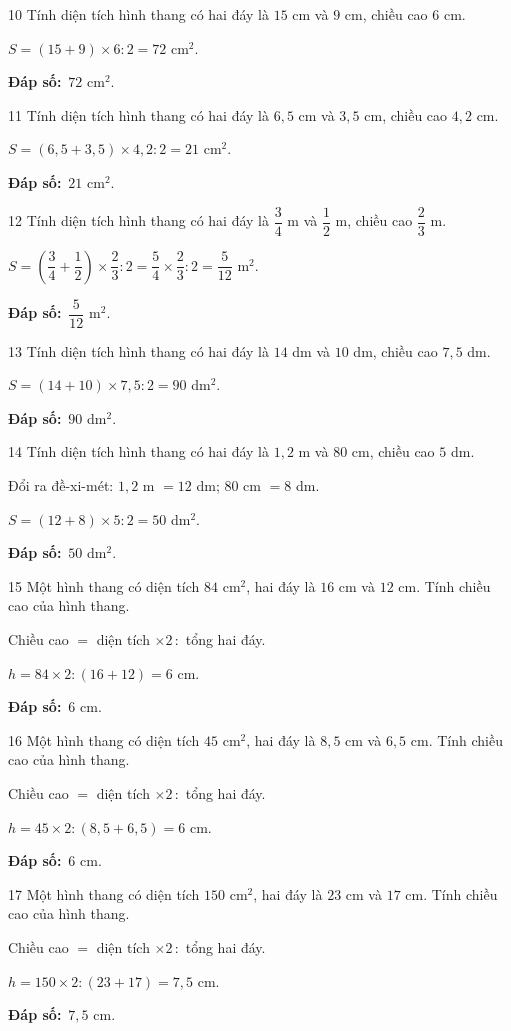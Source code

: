 \documentclass[11pt]{article}
\newif\ifsol \solfalse
\providecommand{\AnsWord}{Đáp số}
\newcommand{\dapso}[1]{\par\textbf{\AnsWord:}\ #1}
\newcommand{\probsol}[1]{%
  \begin{lrbox}{\solmeasure}\begin{minipage}{\dimexpr\linewidth-24pt\relax}#1\end{minipage}\end{lrbox}%
  \ifsol
    \begin{solbox}#1\end{solbox}%
  \else
    \setlength{\solht}{\dimexpr\ht\solmeasure+\dp\solmeasure+0.85cm\relax}%
    \ifdim\solht<1.35cm\setlength{\solht}{1.35cm}\fi
    \begin{tcolorbox}[colback=white,colframe=Line,boxrule=0.8pt,arc=5pt,
      left=8pt,right=8pt,top=4pt,bottom=4pt,height=\solht]{\footnotesize\color{Slate}\itshape\WorkWord}\end{tcolorbox}%
  \fi}
\newcommand{\gap}{\vspace{0.3cm}}
\def\WorkWord{Bài làm:}
\def\AnsWord{Đáp số}
\begin{document}
\gap
\begin{probbox}{10}{\relax}
Tính diện tích hình thang có hai đáy là $15$ cm và $9$ cm, chiều cao $6$ cm.
\end{probbox}
\probsol{
$S=(15+9)\times6:2=72$ cm$^2$.
\dapso{$72$ cm$^2$.}}
\gap
\begin{probbox}{11}{\relax}
Tính diện tích hình thang có hai đáy là $6{,}5$ cm và $3{,}5$ cm, chiều cao $4{,}2$ cm.
\end{probbox}
\probsol{
$S=(6{,}5+3{,}5)\times4{,}2:2=21$ cm$^2$.
\dapso{$21$ cm$^2$.}}
\gap
\begin{probbox}{12}{\relax}
Tính diện tích hình thang có hai đáy là $\dfrac34$ m và $\dfrac12$ m, chiều cao $\dfrac23$ m.
\end{probbox}
\probsol{
$S=\left(\dfrac34+\dfrac12\right)\times\dfrac23:2=\dfrac54\times\dfrac23:2=\dfrac5{12}$ m$^2$.
\dapso{$\dfrac5{12}$ m$^2$.}}
\gap
\begin{probbox}{13}{\relax}
Tính diện tích hình thang có hai đáy là $14$ dm và $10$ dm, chiều cao $7{,}5$ dm.
\end{probbox}
\probsol{
$S=(14+10)\times7{,}5:2=90$ dm$^2$.
\dapso{$90$ dm$^2$.}}
\gap
\begin{probbox}{14}{\relax}
Tính diện tích hình thang có hai đáy là $1{,}2$ m và $80$ cm, chiều cao $5$ dm.
\end{probbox}
\probsol{
Đổi ra đề-xi-mét: $1{,}2$ m $=12$ dm; $80$ cm $=8$ dm.\par $S=(12+8)\times5:2=50$ dm$^2$.
\dapso{$50$ dm$^2$.}}
\gap
\begin{probbox}{15}{\relax}
Một hình thang có diện tích $84$ cm$^2$, hai đáy là $16$ cm và $12$ cm. Tính chiều cao của hình thang.
\end{probbox}
\probsol{
Chiều cao $=$ diện tích $\times2\,:$ tổng hai đáy.\par $h=84\times2:(16+12)=6$ cm.
\dapso{$6$ cm.}}
\gap
\begin{probbox}{16}{\relax}
Một hình thang có diện tích $45$ cm$^2$, hai đáy là $8{,}5$ cm và $6{,}5$ cm. Tính chiều cao của hình thang.
\end{probbox}
\probsol{
Chiều cao $=$ diện tích $\times2\,:$ tổng hai đáy.\par $h=45\times2:(8{,}5+6{,}5)=6$ cm.
\dapso{$6$ cm.}}
\gap
\begin{probbox}{17}{\relax}
Một hình thang có diện tích $150$ cm$^2$, hai đáy là $23$ cm và $17$ cm. Tính chiều cao của hình thang.
\end{probbox}
\probsol{
Chiều cao $=$ diện tích $\times2\,:$ tổng hai đáy.\par $h=150\times2:(23+17)=7{,}5$ cm.
\dapso{$7{,}5$ cm.}}
\end{document}
